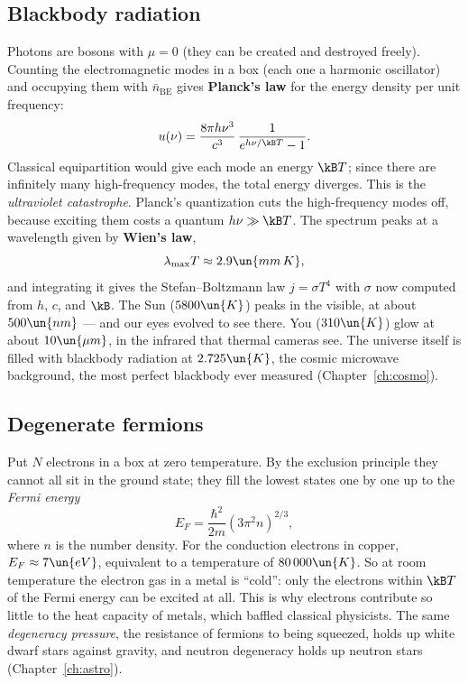 \subsection{Blackbody radiation}
Photons are bosons with $\mu=0$ (they can be created and destroyed freely). Counting the electromagnetic modes in a box (each one a harmonic oscillator) and occupying them with $\bar n_{\text{BE}}$ gives \textbf{Planck's law} for the energy density per unit frequency:
\[
  u(\nu) = \frac{8\pi h\nu^3}{c^3}\,\frac{1}{e^{h\nu/\kB T}-1}.
\]
Classical equipartition would give each mode an energy $\kB T$; since there are infinitely many high-frequency modes, the total energy diverges. This is the \emph{ultraviolet catastrophe}. Planck's quantization cuts the high-frequency modes off, because exciting them costs a quantum $h\nu\gg\kB T$. The spectrum peaks at a wavelength given by \textbf{Wien's law},
\[
  \lambda_{\max}T \approx 2.9\un{mm\,K},
\]
and integrating it gives the Stefan--Boltzmann law $j = \sigma T^4$ with $\sigma$ now computed from $h$, $c$, and $\kB$. The Sun ($5800\un{K}$) peaks in the visible, at about $500\un{nm}$ --- and our eyes evolved to see there. You ($310\un{K}$) glow at about $10\un{\mu m}$, in the infrared that thermal cameras see. The universe itself is filled with blackbody radiation at $2.725\un{K}$, the cosmic microwave background, the most perfect blackbody ever measured (Chapter~\ref{ch:cosmo}).

\subsection{Degenerate fermions}
Put $N$ electrons in a box at zero temperature. By the exclusion principle they cannot all sit in the ground state; they fill the lowest states one by one up to the \emph{Fermi energy}
\[
  E_F = \frac{\hbar^2}{2m}\left(3\pi^2 n\right)^{2/3},
\]
where $n$ is the number density. For the conduction electrons in copper, $E_F\approx7\un{eV}$, equivalent to a temperature of $80\,000\un{K}$. So at room temperature the electron gas in a metal is ``cold'': only the electrons within $\kB T$ of the Fermi energy can be excited at all. This is why electrons contribute so little to the heat capacity of metals, which baffled classical physicists. The same \emph{degeneracy pressure}, the resistance of fermions to being squeezed, holds up white dwarf stars against gravity, and neutron degeneracy holds up neutron stars (Chapter~\ref{ch:astro}).


